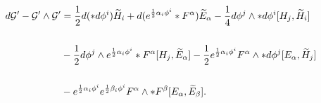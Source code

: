 \begin{equation}
\begin{aligned}
d\mathcal{G}^{\prime }-\mathcal{G}^{\prime }\wedge \mathcal{G}^{\prime }&=%
\frac{1}{2}d(\ast d\phi ^{i})\widetilde{H}_{i}+d(e^{\frac{1}{2%
}\alpha _{i}\phi ^{i}}\ast F^{\alpha })\widetilde{E}_{\alpha }-\frac{1}{4}d%
\phi ^{j}\wedge \ast d\phi ^{i}[H_{j},\widetilde{H}_{i}]\\
\\
&-\frac{1}{2}d\phi ^{j}\wedge e^{\frac{1}{2}\alpha _{i}\phi
^{i}}\ast F^{\alpha }[H_{j},\widetilde{E}_{\alpha }]-\frac{1}{2}e^{%
\frac{1}{2}\alpha _{i}\phi ^{i}}F^{\alpha }\wedge \ast d\phi
^{j}[E_{\alpha },\widetilde{H}_{j}] \\
\\
&-e^{\frac{1}{2}\alpha _{i}\phi ^{i}}e^{\frac{1}{2}\beta
_{i}\phi ^{i}}F^{\alpha }\wedge \ast F^{\beta }[E_{\alpha },\widetilde{E}%
_{\beta }].
\end{aligned}
\end{equation}

